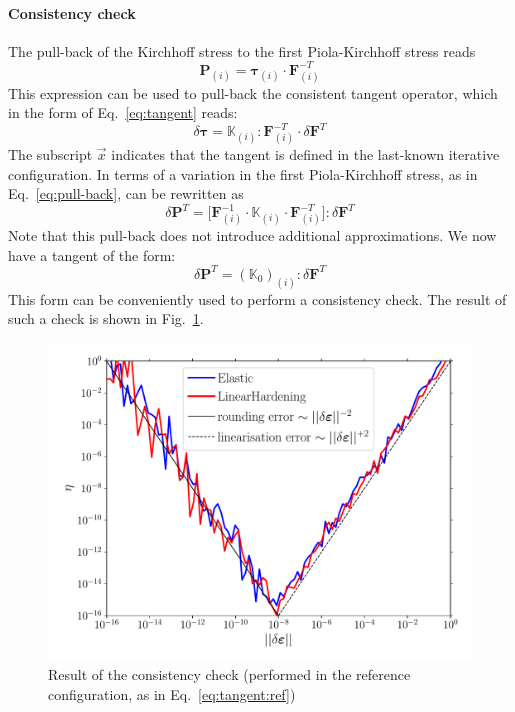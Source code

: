 \documentclass{goose-article}
\newcommand\T[1]{\bm{{#1}}}
\newcommand\TT[1]{\mathbb{{#1}}}
\begin{document}
\paragraph{Consistency check}

The pull-back of the Kirchhoff stress to the first Piola-Kirchhoff stress reads
\begin{equation}
  \T{P}_{(i)} = \bm{\tau}_{(i)} \cdot \T{F}^{-T}_{(i)}
\end{equation}
This expression can be used to pull-back the consistent tangent operator, which in the form of Eq.~\eqref{eq:tangent} reads:
\begin{equation}
  \delta \bm{\tau}
  =
  \TT{K}_{(i)}
  : \T{F}_{(i)}^{-T} \cdot \delta \T{F}^T
  \label{eq:pull-back}
\end{equation}
%
The subscript $\vec{x}$ indicates that the tangent is defined in the last-known iterative configuration. In terms of a variation in the first Piola-Kirchhoff stress, as in Eq.~\eqref{eq:pull-back}, can be rewritten as
%
\begin{equation}
  \delta \T{P}^T
  =
  \big[
  \T{F}_{(i)}^{-1} \cdot
  \TT{K}_{(i)}
  \cdot \T{F}_{(i)}^{-T}
  \big]
  : \delta \T{F}^T
\end{equation}
%
Note that this pull-back does not introduce additional approximations. We now have a tangent of the form:
\begin{equation}
  \delta \T{P}^T = (\TT{K}_0)_{(i)} : \delta \T{F}^T
  \label{eq:tangent:ref}
\end{equation}
This form can be conveniently used to perform a consistency check. The result of such a check is shown in Fig.~\ref{fig:consistency}.

\begin{figure}[htp]
  \centering
  \includegraphics[width=.5\textwidth]{examples/consistency}
  \caption{Result of the consistency check (performed in the reference configuration, as in Eq.~\eqref{eq:tangent:ref})}
  \label{fig:consistency}
\end{figure}


\end{document}
